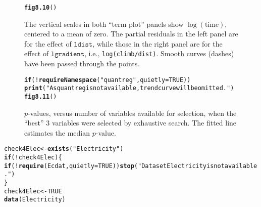 \documentclass[12pt, a4paper,  BCOR=8.25mm, DIV=15]{scrartcl}\usepackage[]{graphicx}\usepackage[]{color}
\makeatletter
\newcommand{\hlnum}[1]{\textcolor[rgb]{0.686,0.059,0.569}{#1}}%
\newcommand{\hlstr}[1]{\textcolor[rgb]{0.192,0.494,0.8}{#1}}%
\newcommand{\hlopt}[1]{\textcolor[rgb]{0,0,0}{#1}}%
\newcommand{\hlstd}[1]{\textcolor[rgb]{0.345,0.345,0.345}{#1}}%
\newcommand{\hlkwa}[1]{\textcolor[rgb]{0.161,0.373,0.58}{\textbf{#1}}}%
\newcommand{\hlkwb}[1]{\textcolor[rgb]{0.69,0.353,0.396}{#1}}%
\newcommand{\hlkwc}[1]{\textcolor[rgb]{0.333,0.667,0.333}{#1}}%
\newcommand{\hlkwd}[1]{\textcolor[rgb]{0.737,0.353,0.396}{\textbf{#1}}}%
\newenvironment{kframe}{%
 \def\at@end@of@kframe{}%
 \ifinner\ifhmode%
  \def\at@end@of@kframe{\end{minipage}}%
  \begin{minipage}{\columnwidth}%
 \fi\fi%
 \def\FrameCommand##1{\hskip\@totalleftmargin \hskip-\fboxsep
 \colorbox{shadecolor}{##1}\hskip-\fboxsep
     \hskip-\linewidth \hskip-\@totalleftmargin \hskip\columnwidth}%
 \MakeFramed {\advance\hsize-\width
   \@totalleftmargin\z@ \linewidth\hsize
   \@setminipage}}%
 {\par\unskip\endMakeFramed%
 \at@end@of@kframe}
\newenvironment{knitrout}{}{} %
\newcommand{\txtt}[1]{{\texttt{#1}}}
\makeatother
\begin{document}
\begin{figure}[H]
\begin{knitrout}
\color{fgcolor}\begin{kframe}
\begin{alltt}
\hlkwd{fig8.10}\hlstd{()}
\end{alltt}
\end{kframe}
\end{knitrout}
\caption{The vertical scales in both ``term plot'' panels show
  $\log(\mbox{time})$, centered to a mean of zero. The partial residuals
  in the left panel are for the effect of $\txtt{ldist}$, while those
  in the right panel are for the effect of $\txtt{lgradient}$, i.e.,
  \txtt{log(climb/dist)}. Smooth curves (dashes) have been passed
  through the points.\label{fig:lnihills-lin}}
\vspace*{-15pt}
\end{figure}

\begin{figure}[H]
\begin{knitrout}
\color{fgcolor}\begin{kframe}
\begin{alltt}
\hlkwa{if}\hlstd{(}\hlopt{!}\hlkwd{requireNamespace}\hlstd{(}\hlstr{"quantreg"}\hlstd{,} \hlkwc{quietly}\hlstd{=}\hlnum{TRUE}\hlstd{))}
    \hlkwd{print}\hlstd{(}\hlstr{"As quantreg is not available, trend curve will be omitted."}\hlstd{)}
\hlkwd{fig8.11}\hlstd{()}
\end{alltt}
\end{kframe}
\end{knitrout}
\caption{$p$-values, versus number of variables available for selection,
  when the ``best'' 3 variables were selected by exhaustive search.
  The fitted line estimates the median $p$-value.\label{fig:exhaust}}
\end{figure}

\begin{knitrout}
\color{fgcolor}\begin{kframe}
\begin{alltt}
\hlstd{check4Elec} \hlkwb{<-} \hlkwd{exists}\hlstd{(}\hlstr{"Electricity"}\hlstd{)}
\hlkwa{if}\hlstd{(}\hlopt{!}\hlstd{check4Elec)\{}
    \hlkwa{if}\hlstd{(}\hlopt{!}\hlkwd{require}\hlstd{(Ecdat,} \hlkwc{quietly}\hlstd{=}\hlnum{TRUE}\hlstd{))}\hlkwd{stop}\hlstd{(}\hlstr{"Dataset Electricity is not available."}\hlstd{)}
\hlstd{\}}
\hlstd{check4Elec} \hlkwb{<-} \hlnum{TRUE}
\hlkwd{data}\hlstd{(Electricity)}
\end{alltt}
\end{kframe}
\end{knitrout}
\end{document}
